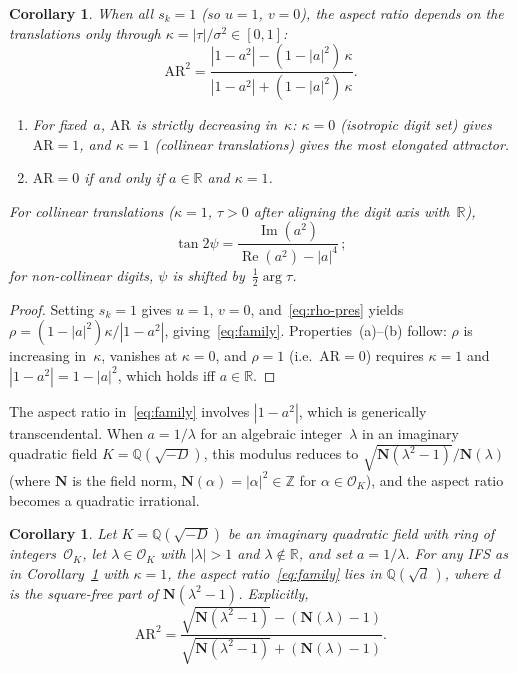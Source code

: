 \documentclass{amsart}
\newtheorem{corollary}[theorem]{Corollary}
\theoremstyle{definition}
\theoremstyle{remark}
\begin{document}
\begin{corollary}\label{cor:kappa}
When all $s_k = 1$ \textup{(}so $u=1$, $v=0$\textup{)},
the aspect ratio depends on the translations only through
$\kappa = |\tau|/\sigma^2 \in [0,1]$:
\begin{equation}\label{eq:family}
  \mathrm{AR}^2 = \frac{|1-a^2| - (1-|a|^2)\,\kappa}{|1-a^2| + (1-|a|^2)\,\kappa}.
\end{equation}
\begin{enumerate}[\upshape(a)]
\item For fixed~$a$, $\mathrm{AR}$ is strictly decreasing in~$\kappa$:
$\kappa=0$ \textup{(}isotropic digit set\textup{)} gives $\mathrm{AR}=1$,
and $\kappa=1$ \textup{(}collinear translations\textup{)} gives the
most elongated attractor.
\item $\mathrm{AR}=0$ if and only if $a \in \mathbb{R}$ and $\kappa=1$.
\end{enumerate}
For collinear translations \textup{(}$\kappa=1$,
$\tau>0$ after aligning the digit axis with~$\mathbb{R}$\textup{)},
\begin{equation}\label{eq:psi-simple}
  \tan 2\psi = \frac{\operatorname{Im}(a^2)}{\operatorname{Re}(a^2)-|a|^4}\,;
\end{equation}
for non-collinear digits, $\psi$ is shifted
by~$\tfrac{1}{2}\arg\tau$.
\end{corollary}

\begin{proof}
Setting $s_k=1$ gives $u=1$, $v=0$, and~\eqref{eq:rho-pres}
yields $\rho = (1-|a|^2)\kappa/|1-a^2|$,
giving~\eqref{eq:family}.
Properties~(a)--(b) follow:
$\rho$ is increasing in~$\kappa$,
vanishes at $\kappa=0$,
and $\rho=1$ (i.e.\ $\mathrm{AR}=0$) requires
$\kappa=1$ and $|1-a^2|=1-|a|^2$,
which holds iff $a \in \mathbb{R}$.
\end{proof}

The aspect ratio in~\eqref{eq:family} involves $|1-a^2|$, which is
generically transcendental.  When $a = 1/\lambda$ for an algebraic
integer~$\lambda$ in an imaginary quadratic field
$K = \mathbb{Q}(\sqrt{-D})$, this modulus reduces to
$\sqrt{\mathbf{N}(\lambda^2-1)}/\mathbf{N}(\lambda)$
(where $\mathbf{N}$ is the field norm,
$\mathbf{N}(\alpha)=|\alpha|^2\in\mathbb{Z}$ for
$\alpha\in\mathcal{O}_K$),
and the aspect ratio becomes a quadratic irrational.

\begin{corollary}\label{cor:field}
Let $K = \mathbb{Q}(\sqrt{-D})$ be an imaginary quadratic field
with ring of integers~$\mathcal{O}_K$,
let $\lambda \in \mathcal{O}_K$ with $|\lambda|>1$ and $\lambda\notin\mathbb{R}$,
and set $a = 1/\lambda$.  For any IFS as in Corollary~\textup{\ref{cor:kappa}}
with $\kappa=1$,
the aspect ratio~\eqref{eq:family} lies
in $\mathbb{Q}(\sqrt{d}\,)$,
where $d$ is the square-free part of $\mathbf{N}(\lambda^2-1)$.
Explicitly,
\begin{equation}\label{eq:field}
  \mathrm{AR}^2
  = \frac{\sqrt{\mathbf{N}(\lambda^2-1)} - (\mathbf{N}(\lambda)-1)}
         {\sqrt{\mathbf{N}(\lambda^2-1)} + (\mathbf{N}(\lambda)-1)}.
\end{equation}
\end{corollary}
\end{document}
